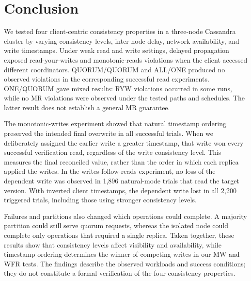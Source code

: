 \section{Conclusion}\label{conclusion:conclusion}

We tested four client-centric consistency properties in a three-node Cassandra cluster by varying consistency levels, inter-node delay, network availability, and write timestamps. Under weak read and write settings, delayed propagation exposed read-your-writes and monotonic-reads violations when the client accessed different coordinators. QUORUM/QUORUM and ALL/ONE produced no observed violations in the corresponding successful read experiments. ONE/QUORUM gave mixed results: RYW violations occurred in some runs, while no MR violations were observed under the tested paths and schedules. The latter result does not establish a general MR guarantee.

The monotonic-writes experiment showed that natural timestamp ordering preserved the intended final overwrite in all successful trials. When we deliberately assigned the earlier write a greater timestamp, that write won every successful verification read, regardless of the write consistency level. This measures the final reconciled value, rather than the order in which each replica applied the writes. In the writes-follow-reads experiment, no loss of the dependent write was observed in 1,896 natural-mode trials that read the target version. With inverted client timestamps, the dependent write lost in all 2,200 triggered trials, including those using stronger consistency levels.

Failures and partitions also changed which operations could complete. A majority partition could still serve quorum requests, whereas the isolated node could complete only operations that required a single replica. Taken together, these results show that consistency levels affect visibility and availability, while timestamp ordering determines the winner of competing writes in our MW and WFR tests. The findings describe the observed workloads and success conditions; they do not constitute a formal verification of the four consistency properties.

